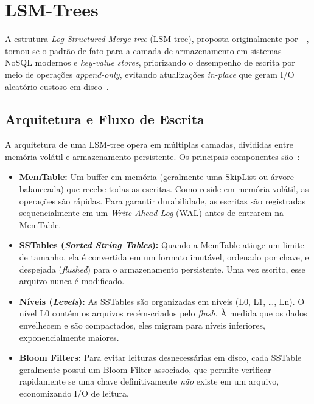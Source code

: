 \section{LSM-Trees}
\label{sec:lsmtree}

A estrutura \textit{Log-Structured Merge-tree} (LSM-tree), proposta originalmente
por~\citeauthor{ONeil1996TheLM}~\cite{ONeil1996TheLM}, tornou-se o padrão de fato
para a camada de armazenamento em sistemas NoSQL modernos e \textit{key-value
stores}, priorizando o desempenho de escrita por meio de operações
\textit{append-only}, evitando atualizações \textit{in-place} que geram I/O
aleatório custoso em disco~\cite{database_internals,lsm_survey}.

\subsection*{Arquitetura e Fluxo de Escrita}

A arquitetura de uma LSM-tree opera em múltiplas camadas, divididas entre memória
volátil e armazenamento persistente. Os principais componentes são~\cite{database_internals,rocksdb}:

\begin{itemize}
    \item \textbf{MemTable:} Um buffer em memória (geralmente uma SkipList ou
    árvore balanceada) que recebe todas as escritas. Como reside em memória
    volátil, as operações são rápidas. Para garantir durabilidade, as escritas são
    registradas sequencialmente em um \textit{Write-Ahead Log} (WAL) antes de
    entrarem na MemTable.

    \item \textbf{SSTables (\textit{Sorted String Tables}):} Quando a MemTable
    atinge um limite de tamanho, ela é convertida em um formato imutável, ordenado
    por chave, e despejada (\textit{flushed}) para o armazenamento persistente.
    Uma vez escrito, esse arquivo nunca é modificado.

    \item \textbf{Níveis (\textit{Levels}):} As SSTables são organizadas em
    níveis (L0, L1, \ldots, Ln). O nível L0 contém os arquivos recém-criados pelo
    \textit{flush}. À medida que os dados envelhecem e são compactados, eles
    migram para níveis inferiores, exponencialmente maiores.

    \item \textbf{Bloom Filters:} Para evitar leituras desnecessárias em disco,
    cada SSTable geralmente possui um Bloom Filter associado, que permite verificar
    rapidamente se uma chave definitivamente \emph{não} existe em um arquivo,
    economizando I/O de leitura.
\end{itemize}

